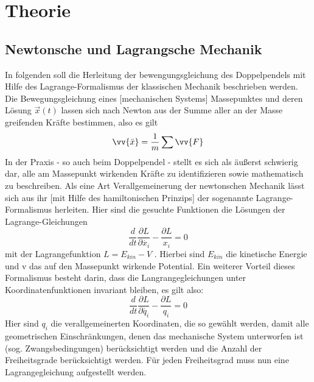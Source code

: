 
\section{Theorie}
\subsection{Newtonsche und Lagrangsche Mechanik}
In folgenden soll die Herleitung der bewengungsgleichung des Doppelpendels mit Hilfe des Lagrange-Formalismus der klassischen Mechanik beschrieben werden. \\
Die Bewegungsgleichung eines [mechanischen Systems] Massepunktes und deren Lösung $\vec{x}(t)$ lassen sich nach Newton aus der Summe aller an der Masse greifenden Kräfte bestimmen, also es gilt \begin{equation}
\vv{\ddot{x}}=\frac{1}{m}\sum \vv{F}
\end{equation}
In der Praxis - so auch beim Doppelpendel - stellt es sich als äußerst schwierig dar, alle am Massepunkt wirkenden Kräfte zu identifizieren sowie mathematisch zu beschreiben. Als eine Art Verallgemeinerung der newtonschen Mechanik lässt sich aus ihr [mit Hilfe des hamiltonischen Prinzips] der sogenannte Lagrange-Formalismus herleiten. Hier sind die gesuchte Funktionen die Lösungen der Lagrange-Gleichungen
\begin{equation}
\frac{d}{dt}\frac{\partial L}{\partial\dot{x_i}}-\frac{\partial L}{x_i} = 0
\end{equation}
mit der Lagrangefunktion  $ L=E_{kin} - V $ . Hierbei sind $E_{kin}$ die kinetische Energie und v das auf den Massepunkt wirkende Potential. Ein weiterer Vorteil dieses Formalismus besteht darin, dass die Langrangegleichungen unter Koordinatenfunktionen invariant bleiben, es gilt also:
\begin{equation}
\frac{d}{dt}\frac{\partial L}{\partial\dot{q_i}}-\frac{\partial L}{q_i} = 0
\end{equation}
Hier sind $q_i$ die verallgemeinerten Koordinaten, die so gewählt werden, damit alle geometrischen Einschränkungen, denen das mechanische System unterworfen ist (sog. Zwangsbedingungen) berücksichtigt werden und die Anzahl der Freiheitsgrade berücksichtigt werden. Für jeden Freiheitsgrad muss nun eine Lagrangegleichung aufgestellt werden.

